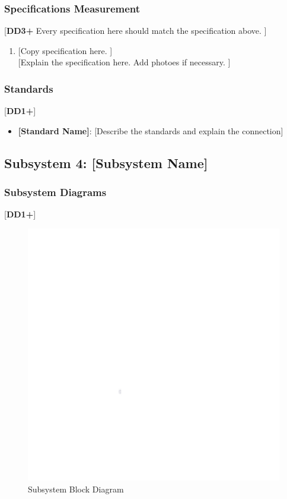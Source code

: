 \documentclass[letterpaper, 11pt]{article}
\begin{document}
\subsubsection{Specifications Measurement}
[\textbf{DD3+} Every specification here should match the specification above. ]
\begin{enumerate}
    \item {[Copy specification here. ]} \\
          {[Explain the specification here. Add photoes if necessary. ]}
\end{enumerate}

\subsubsection{Standards}
[\textbf{DD1+}]
\begin{itemize}
    \item \textbf{[Standard Name]}: [Describe the standards and explain the connection]
\end{itemize}

\clearpage
\subsection{Subsystem 4: [Subsystem Name]}

\subsubsection{Subsystem Diagrams}
[\textbf{DD1+}]
\begin{figure}[h]
    \centering
    \includegraphics[width=16cm]{images/white.png} %
    \caption{Subsystem Block Diagram}
\end{figure} %
\end{document}
